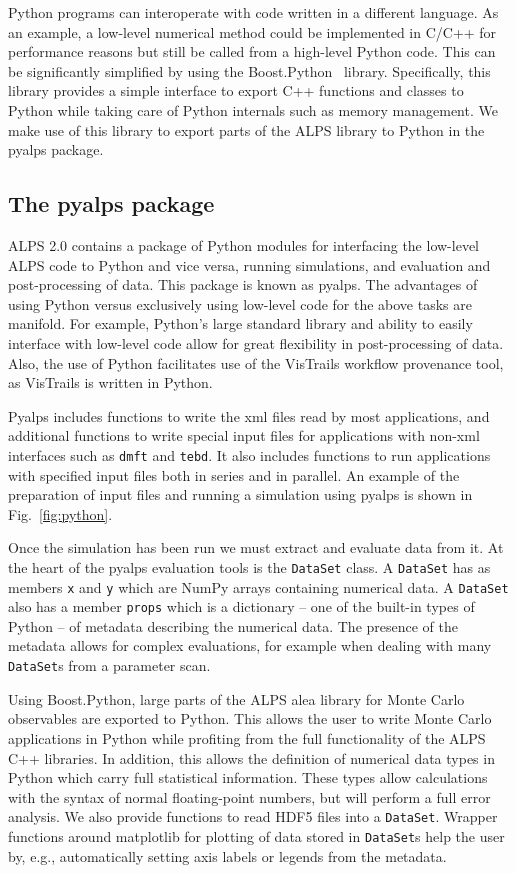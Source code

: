 \documentclass[12pt]{iopart}
\begin{document}
Python programs can interoperate with code written in a different language. As an example, a low-level numerical method could be implemented in C/C++ for performance reasons but still be called from a high-level Python code. This can be significantly simplified by using the Boost.Python~\cite{boost} library. Specifically, this library provides a simple interface to export C++ functions and classes to Python while taking care of Python internals such as memory management. We make use of this library to export parts of the ALPS library to Python in the pyalps package.

\subsection{The pyalps package}
ALPS 2.0 contains a package of Python modules for interfacing the low-level ALPS code to Python and vice versa, running simulations, and evaluation and post-processing of data. This package is known as pyalps. The advantages of using Python versus exclusively using low-level code for the above tasks are manifold. For example, Python's large standard library and ability to easily interface with low-level code allow for great flexibility in post-processing of data. Also, the use of Python facilitates use of the VisTrails workflow provenance tool, as VisTrails is written in Python.

Pyalps includes functions to write the xml files read by most applications, and additional functions to write special input files for applications with non-xml interfaces such as {\tt dmft} and {\tt tebd}. It also includes functions to run applications with specified input files both in series and in parallel. An example of the preparation of input files and running a simulation using pyalps is shown in Fig.~\ref{fig:python}.

Once the simulation has been run we must extract and evaluate data from it. At the heart of the pyalps evaluation tools is the {\tt DataSet} class. A {\tt DataSet} has as members {\tt x} and {\tt y} which are NumPy arrays containing numerical data. A {\tt DataSet} also has a member {\tt props} which is a dictionary -- one of the built-in types of Python -- of metadata describing the numerical data. The presence of the metadata allows for complex evaluations, for example when dealing with many {\tt DataSet}s from a parameter scan.

Using Boost.Python, large parts of the ALPS alea library for Monte Carlo observables are exported to Python. This allows the user to write Monte Carlo applications in Python while profiting from the full functionality of the ALPS C++ libraries. In addition, this allows the definition of numerical data types in Python which carry full statistical information. These types allow calculations with the syntax of normal floating-point numbers, but will perform a full error analysis. We also provide functions to read HDF5 files into a {\tt DataSet}. Wrapper functions around matplotlib for plotting of data stored in {\tt DataSet}s help the user by, e.g., automatically setting axis labels or legends from the metadata.
\end{document}
